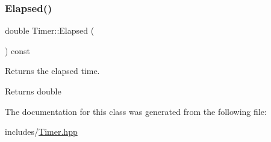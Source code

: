 \subsubsection{\texorpdfstring{Elapsed()}{Elapsed()}}
{\footnotesize\ttfamily double Timer\+::\+Elapsed (\begin{DoxyParamCaption}{ }\end{DoxyParamCaption}) const\hspace{0.3cm}{\ttfamily [inline]}}



Returns the elapsed time. 

\begin{DoxyReturn}{Returns}
double 
\end{DoxyReturn}


The documentation for this class was generated from the following file\+:\begin{DoxyCompactItemize}
\item 
includes/\mbox{\hyperlink{_timer_8hpp}{Timer.\+hpp}}\end{DoxyCompactItemize}
